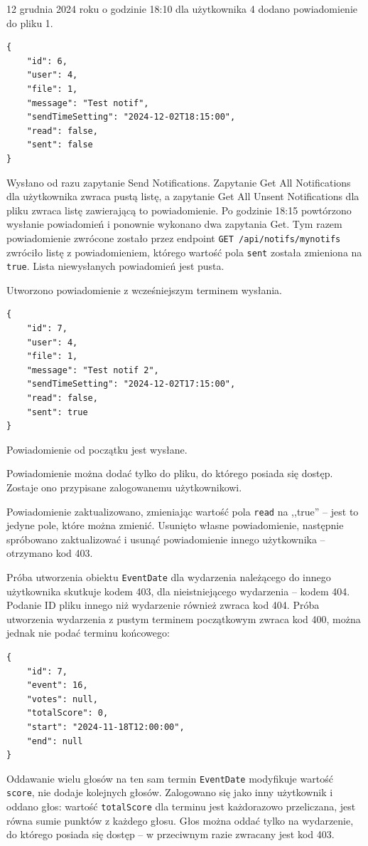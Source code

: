 \documentclass[a4paper,twoside,12pt]{book}
\begin{document}
12 grudnia 2024 roku o godzinie 18:10 dla użytkownika 4 dodano powiadomienie do pliku 1. 
\begin{verbatim}
{
	"id": 6,
	"user": 4,
	"file": 1,
	"message": "Test notif",
	"sendTimeSetting": "2024-12-02T18:15:00",
	"read": false,
	"sent": false
}
\end{verbatim}
Wysłano od razu zapytanie Send Notifications. Zapytanie Get All Notifications dla użytkownika zwraca pustą listę, a zapytanie Get All Unsent Notifications dla pliku zwraca listę zawierającą to powiadomienie. Po godzinie 18:15 powtórzono wysłanie powiadomień i ponownie wykonano dwa zapytania Get. Tym razem powiadomienie zwrócone zostało przez endpoint \texttt{GET /api/notifs/mynotifs} zwróciło listę z powiadomieniem, którego wartość pola \texttt{sent} została zmieniona na \texttt{true}. Lista niewysłanych powiadomień jest pusta.

Utworzono powiadomienie z wcześniejszym terminem wysłania.
\begin{verbatim}
{
	"id": 7,
	"user": 4,
	"file": 1,
	"message": "Test notif 2",
	"sendTimeSetting": "2024-12-02T17:15:00",
	"read": false,
	"sent": true
}
\end{verbatim}
Powiadomienie od początku jest wysłane.

Powiadomienie można dodać tylko do pliku, do którego posiada się dostęp. Zostaje ono przypisane zalogowanemu użytkownikowi.

Powiadomienie zaktualizowano, zmieniając wartość pola \texttt{read} na ,,true'' -- jest to jedyne pole, które można zmienić. Usunięto własne powiadomienie, następnie spróbowano zaktualizować i usunąć powiadomienie innego użytkownika -- otrzymano kod 403.

Próba utworzenia obiektu \texttt{EventDate} dla wydarzenia należącego do innego użytkownika skutkuje kodem 403, dla nieistniejącego wydarzenia -- kodem 404. Podanie ID pliku innego niż wydarzenie również zwraca kod 404. Próba utworzenia wydarzenia z pustym terminem początkowym zwraca kod 400, można jednak nie podać terminu końcowego:
\begin{verbatim}
{
	"id": 7,
	"event": 16,
	"votes": null,
	"totalScore": 0,
	"start": "2024-11-18T12:00:00",
	"end": null
}
\end{verbatim}

Oddawanie wielu głosów na ten sam termin \texttt{EventDate} modyfikuje wartość \texttt{score}, nie dodaje kolejnych głosów. Zalogowano się jako inny użytkownik i oddano głos: wartość \texttt{totalScore} dla terminu jest każdorazowo przeliczana, jest równa sumie punktów z każdego głosu. Głos można oddać tylko na wydarzenie, do którego posiada się dostęp -- w przeciwnym razie zwracany jest kod 403.
\end{document}
